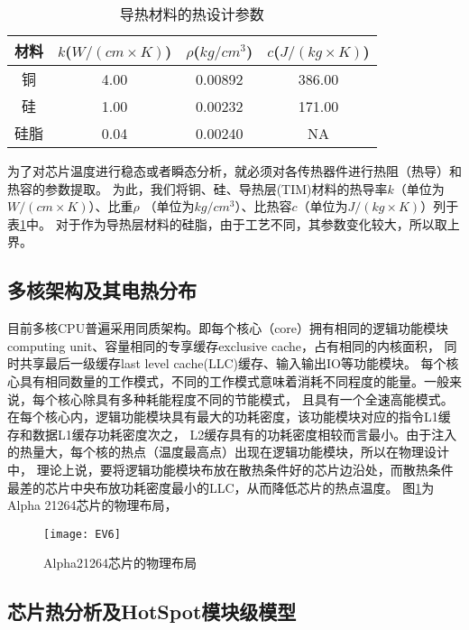 \begin{table}
\centering
\caption{导热材料的热设计参数}
\begin{tabular}{c c c c}
\hline\hline
材料 & $k$($W/(cm \times K)$) & $\rho$($kg/cm^3$) & $c$($J/(kg \times K)$) \\ [0.5ex]
\hline
铜 & 4.00 & 0.00892 & 386.00  \\
硅 & 1.00 & 0.00232 & 171.00 \\
硅脂 & 0.04 & 0.00240 & NA \\
\hline
\end{tabular}
\label{tab:chap4:cu-si-material}
\end{table}

为了对芯片温度进行稳态或者瞬态分析，就必须对各传热器件进行热阻（热导）和热容的参数提取。 为此，我们将铜、硅、导热层(TIM)材料的热导率$k$（单位为$W/(cm \times K)$）、比重$\rho$ （单位为$kg/cm^3$）、比热容$c$（单位为$J/(kg \times K)$）列于表\ref{tab:chap4:cu-si-material}中。 对于作为导热层材料的硅脂，由于工艺不同，其参数变化较大，所以取上界。


\subsection{多核架构及其电热分布}

目前多核CPU普遍采用同质架构。即每个核心（core）拥有相同的逻辑功能模块computing unit、容量相同的专享缓存exclusive cache，占有相同的内核面积， 同时共享最后一级缓存last level cache(LLC)缓存、输入输出IO等功能模块。 每个核心具有相同数量的工作模式，不同的工作模式意味着消耗不同程度的能量。一般来说，每个核心除具有多种耗能程度不同的节能模式， 且具有一个全速高能模式。
在每个核心内，逻辑功能模块具有最大的功耗密度，该功能模块对应的指令L1缓存和数据L1缓存功耗密度次之， L2缓存具有的功耗密度相较而言最小。由于注入的热量大，每个核的热点（温度最高点）出现在逻辑功能模块，所以在物理设计中，
理论上说，要将逻辑功能模块布放在散热条件好的芯片边沿处，而散热条件最差的芯片中央布放功耗密度最小的LLC，从而降低芯片的热点温度。 图\ref{fig:ev6}为Alpha 21264芯片的物理布局，

\begin{figure}[H]
  \centering
  \texttt{[image: EV6]}
  \caption{Alpha21264芯片的物理布局}
  \label{fig:ev6}
\end{figure}


\subsection{芯片热分析及HotSpot模块级模型}

